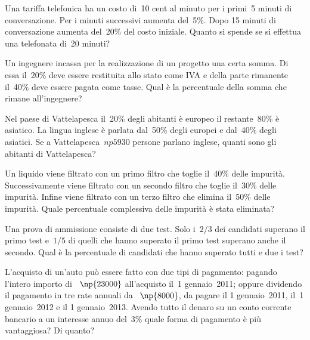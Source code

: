 \begin{multicols}{2}
\begin{esercizio}[\Ast]
Una tariffa telefonica ha un costo di~10 cent al minuto per i primi~5
minuti di conversazione. Per i minuti successivi aumenta del~5\%. Dopo
15 minuti di conversazione aumenta del~20\% del costo iniziale. Quanto
si spende se si effettua una telefonata di~20 minuti?
\end{esercizio}

\begin{esercizio}
Un ingegnere incassa per la realizzazione di un progetto una
certa somma. Di essa il~20\% deve essere restituita allo stato come IVA
e della parte rimanente il~40\% deve essere pagata come tasse. Qual è
la percentuale della somma che rimane all'ingegnere?
\end{esercizio}

\begin{esercizio}
Nel paese di Vattelapesca il~20\% degli abitanti è europeo il
restante~80\% è asiatico. La lingua inglese è parlata dal~50\% degli
europei e dal~40\% degli asiatici. Se a Vattelapesca~$np{5930}$ persone
parlano inglese, quanti sono gli abitanti di Vattelapesca?
\end{esercizio}

\begin{esercizio}
Un liquido viene filtrato con un primo filtro che toglie il~40\%
delle impurità. Successivamente viene filtrato con un secondo filtro
che toglie il~30\% delle impurità. Infine viene filtrato con un terzo
filtro che elimina il~50\% delle impurità. Quale percentuale
complessiva delle impurità è stata eliminata?
\end{esercizio}

\begin{esercizio}
Una prova di ammissione consiste di due test. Solo i~$2/3$ dei
candidati superano il primo test e~$1/5$ di quelli che hanno superato il
primo test superano anche il secondo. Qual è la percentuale di
candidati che hanno superato tutti e due i test?
\end{esercizio}

\begin{esercizio}
L'acquisto di un'auto può essere fatto con due tipi di pagamento: pagando
l'intero importo di \officialeuro~$\np{23000}$ all'acquisto il~1{\textdegree} gennaio~2011; oppure
dividendo il pagamento in tre rate annuali da \officialeuro~$\np{8000}$, da pagare il
1{\textdegree} gennaio~2011, il~1{\textdegree} gennaio~2012 e il
1{\textdegree} gennaio~2013. Avendo tutto il denaro su un conto
corrente bancario a un interesse annuo del~3\% quale forma di pagamento
è più vantaggiosa? Di quanto?
\end{esercizio}


\end{multicols}
